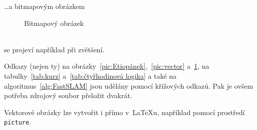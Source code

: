 \documentclass[a4paper, 11pt]{article}
\begin{document}
\dots a bitmapovým obrázkem
\begin{figure}[h]
	\centering
	\caption{Bitmapový obrázek}
	\label{pic:bitmap}
\end{figure}
\bigskip\\
se projeví například při zvětšení.

Odkazy (nejen ty) na obrázky~\ref{pic:Etiopánek},~\ref{pic:vector} a~\ref{pic:bitmap}, na tabulky~\ref{tab:kurz} a~\ref{tab:čtyřhodinová logika} a také na algoritmus~\ref{alg:FastSLAM} jsou udělány pomocí křížových odkazů. Pak je ovšem potřeba zdrojový soubor přeložit dvakrát.

Vektorové obrázky lze vytvořit i přímo v~\LaTeX u, například pomocí prostředí\, \verb|picture|.
\end{document}

